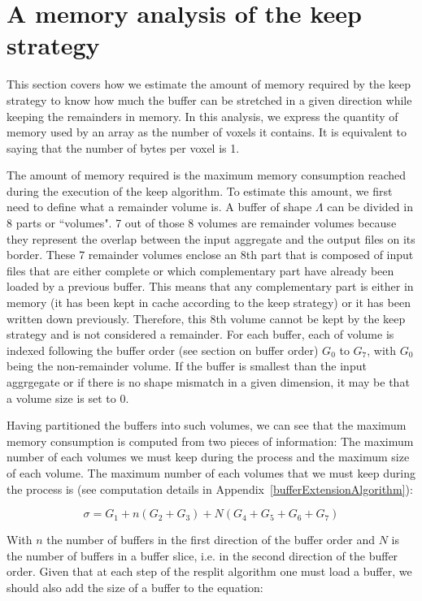 \documentclass[conference]{IEEEtran}
\begin{document}
\section{A memory analysis of the keep strategy}
This section covers how we estimate the amount of memory required by the keep
strategy to know how much the buffer can be stretched in a given direction while
keeping the remainders in memory. In this analysis, we express the quantity of
memory used by an array as the number of voxels it contains. It is equivalent
to saying that the number of bytes per voxel is 1.

The amount of memory required is the maximum memory consumption reached during
the execution of the keep algorithm. To estimate this amount, we first need to
define what a remainder volume is. A buffer of shape $\Lambda$ can be divided in
8 parts or ``volumes". 7 out of those 8 volumes are remainder volumes because
they represent the overlap between the input aggregate and the output files on
its border. These 7 remainder volumes enclose an 8th part that is composed of
input files that are either complete or which complementary part have already
been loaded by a previous buffer. This means that any complementary part is either
in memory (it has been kept in cache according to the keep strategy) or it has
been written down previously. Therefore, this 8th volume cannot be kept by the
keep strategy and is not considered a remainder. For each buffer, each of volume
is indexed following the buffer order (see section on buffer order) $G_0$ to $G_7$, with
$G_0$ being the non-remainder volume. If the buffer is smallest than the input
aggrgegate or if there is no shape mismatch in a given dimension, it may be that
a volume size is set to 0.

Having partitioned the buffers into such volumes, we can see that the maximum
memory consumption is computed from two pieces of information: The maximum number
of each volumes we must keep during the process and the maximum size of each
volume. The maximum number of each volumes that we must keep during the process
is (see computation details in Appendix~\ref{bufferExtensionAlgorithm}):

\begin{equation} \label{eq:1}
\sigma = G_1 + n(G_2 + G_3) + N(G_4 + G_5 + G_6 + G_7)
\end{equation}

With $n$ the number of buffers in the first direction of the buffer order and
$N$ is the number of buffers in a buffer slice, i.e. in the second direction of
the buffer order. Given that at each step of the resplit algorithm one must
load a buffer, we should also add the size of a buffer to the equation:
\end{document}
